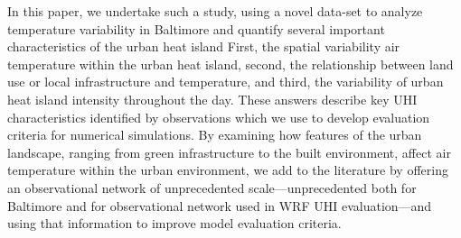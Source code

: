 In this paper, we undertake such a study, using  %
 a novel data-set to analyze temperature variability in Baltimore and quantify several important characteristics of the urban heat island 
   First, the spatial variability air temperature within the urban heat island, second, the relationship between land use or local infrastructure and temperature, and third, the variability of urban heat island intensity throughout the day.
These answers describe key UHI characteristics identified by observations which we use to develop evaluation criteria for numerical simulations. 
By examining how features of the urban landscape, ranging from green infrastructure to the built environment, affect air temperature within the urban environment, we add to the literature by offering an observational network of unprecedented scale---unprecedented both for Baltimore and for observational network used in WRF UHI evaluation---and using that information to improve model evaluation criteria. 

